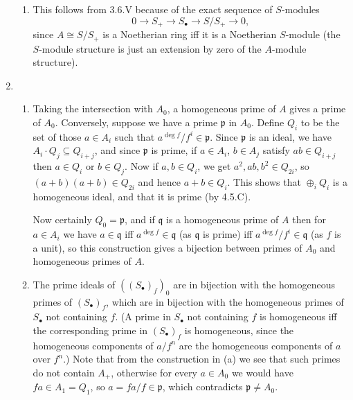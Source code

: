 \documentclass{report}
\newcommand{\p}{\mathfrak{p}}
\newcommand{\q}{\mathfrak{q}}
\begin{document}
\begin{enumerate}[label=\textbf{4.5.\Alph*.}]
\begin{enumerate}[label=(\alph*)]
		      \item This follows from 3.6.V because of the exact sequence of
		            $S$-modules
		            \begin{equation*}
			            0 \to S_+ \to S_\bullet \to S/S_+ \to 0,
		            \end{equation*}
		            since $A\cong S/S_+$ is a Noetherian ring iff it is a Noetherian
		            $S$-module (the $S$-module structure is just an extension by
		            zero of the $A$-module structure).
	      \end{enumerate}

	\item
	      \begin{enumerate}[label=(\alph*)]
		      \item Taking the intersection with $A_0$, a homogeneous prime of $A$
		            gives a prime of $A_0$. Conversely, suppose we have a prime $\p$
		            in $A_0$. Define $Q_i$ to be the set of those $a\in A_i$ such
		            that $a^{\deg f}/f^i\in\p$. Since $\p$ is an ideal, we have
		            $A_i\cdot Q_j\subseteq Q_{i+j}$, and since $\p$ is prime, if
		            $a\in A_i$, $b\in A_j$ satisfy $ab\in Q_{i+j}$ then $a\in Q_i$
		            or $b\in Q_j$. Now if $a,b\in Q_i$, we get $a^2,ab,b^2\in
			            Q_{2i}$, so $(a+b)(a+b)\in Q_{2i}$ and hence $a+b\in Q_i$. This
		            shows that $\oplus_iQ_i$ is a homogeneous ideal, and that it is
		            prime (by 4.5.C).

		            Now certainly $Q_0=\p$, and if $\q$ is a homogeneous prime of
		            $A$ then for $a\in A_i$ we have $a\in\q$ iff $a^{\deg f}\in\q$
		            (as $\q$ is prime) iff $a^{\deg f}/f^i\in\q$ (as $f$ is a unit),
		            so this construction gives a bijection between primes of $A_0$
		            and homogeneous primes of $A$.

		      \item The prime ideals of $((S_\bullet)_f)_0$ are in bijection with
		            the homogeneous primes of $(S_\bullet)_f$, which are in
		            bijection with the homogeneous primes of $S_\bullet$ not
		            containing $f$. (A prime in $S_\bullet$ not containing $f$ is
		            homogeneous iff the corresponding prime in $(S_\bullet)_f$ is
		            homogeneous, since the homogeneous components of $a/f^n$ are the
		            homogeneous components of $a$ over $f^n$.) Note that from the
		            construction in (a) we see that such primes do not contain $A_+$,
		            otherwise for every $a\in A_0$ we would have $fa\in A_1=Q_1$, so
		            $a=fa/f\in\p$, which contradicts $\p\ne A_0$.
	      \end{enumerate}


\end{enumerate}
\end{document}
